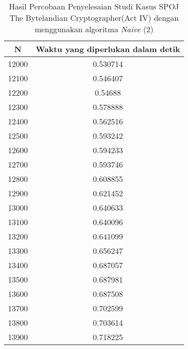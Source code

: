 \begin{table}[H]
\centering
\begin{tabular}{|c|c|}\hline
N&Waktu yang diperlukan dalam detik\\ \hline
12000&0.530714\\ \hline
12100&0.546407\\ \hline
12200&0.54688\\ \hline
12300&0.578888\\ \hline
12400&0.562516\\ \hline
12500&0.593242\\ \hline
12600&0.594233\\ \hline
12700&0.593746\\ \hline
12800&0.608855\\ \hline
12900&0.621452\\ \hline
13000&0.640633\\ \hline
13100&0.640096\\ \hline
13200&0.641099\\ \hline
13300&0.656247\\ \hline
13400&0.687057\\ \hline
13500&0.687981\\ \hline
13600&0.687508\\ \hline
13700&0.702599\\ \hline
13800&0.703614\\ \hline
13900&0.718225\\ \hline
\end{tabular}
\caption {Hasil Percobaan Penyelesaian Studi Kasus SPOJ The Bytelandian Cryptographer(Act IV) dengan menggunakan algoritma \textit{Naive} (2)}
\label{tab1:1res4}
\end{table}
